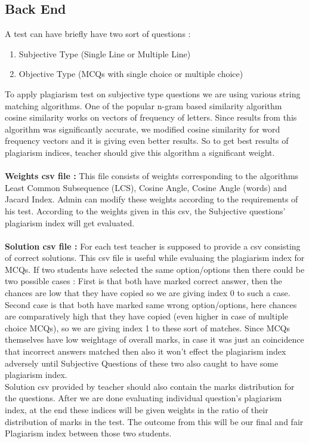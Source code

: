 \subsection{Back End}
 A test can have briefly have two sort of questions :
 \begin{enumerate}
     \item Subjective Type (Single Line or Multiple Line)
     \item Objective Type (MCQs with single choice or multiple choice)
 \end{enumerate}
 To apply plagiarism test on subjective type questions we are using various string matching algorithms. One of the popular n-gram based similarity algorithm cosine similarity works on vectors of frequency of letters. Since results from this algorithm was significantly accurate, we modified cosine similarity for word frequency vectors and it is giving even better results. So to get best results of plagiarism indices, teacher should give this algorithm a significant weight. \\ \\
 \textbf{Weights csv file : } This file consists of weights corresponding to the algorithms Least Common Subsequence (LCS), Cosine Angle, Cosine Angle (words) and Jacard Index.
 Admin can modify these weights according to the requirements of his test. According to the weights given in this csv, the Subjective questions' plagiarism index will get evaluated. \\ \\
 \textbf{Solution csv file :} For each test teacher is supposed to provide a csv consisting of correct solutions. This csv file is useful while evaluaing the plagiarism index for MCQs. If two students have selected the same option/options then there could be two possible cases : First is that both have marked correct answer, then the chances are low that they have copied so we are giving index 0 to such a case. \\
 Second case is that both have marked same wrong option/options, here chances are comparatively high that they have copied (even higher in case of multiple choice MCQs), so we are giving index 1 to these sort of matches. Since MCQs themselves have low weightage of overall marks, in case it was just an coincidence that incorrect answers matched then also it won't effect the plagiarism index adversely until Subjective Questions of these two also caught to have some plagiarism index. \\
 
 Solution csv provided by teacher should also contain the marks distribution for the questions. After we are done evaluating individual question's plagiarism index, at the end these indices will be given weights in the ratio of their distribution of marks in the test. The outcome from this will be our final and fair Plagiarism index between those two students. 
 
 
 

